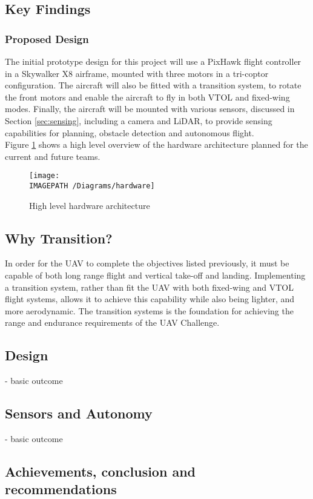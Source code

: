 \subsection{Key Findings}
\subsubsection*{Proposed Design}
The initial prototype design for this project will use a PixHawk flight controller in a Skywalker X8 airframe, mounted with three motors in a tri-coptor configuration. The aircraft will also be fitted with a transition system, to rotate the front motors and enable the aircraft to fly in both VTOL and fixed-wing modes. Finally, the aircraft will be mounted with various sensors, discussed in Section \ref{sec:sensing}, including a camera and LiDAR, to provide sensing capabilities for planning, obstacle detection and autonomous flight.\\

Figure \ref{fig:hardwarearch} shows a high level overview of the hardware architecture planned for the current and future teams.

\begin{figure}[!h]
	\centering
	\texttt{[image: \\IMAGEPATH /Diagrams/hardware]}
	\caption{High level hardware architecture}
	\label{fig:hardwarearch}
\end{figure}

\subsection{Why Transition?}
In order for the UAV to complete the objectives listed previously, it must be capable of both long range flight and vertical take-off and landing. Implementing a transition system, rather than fit the UAV with both fixed-wing and VTOL flight systems, allows it to achieve this capability while also being lighter, and more aerodynamic. The transition systems is the foundation for achieving the range and endurance requirements of the UAV Challenge.

\subsection{Design}
- basic outcome
\subsection{Sensors and Autonomy}
- basic outcome
\subsection{Achievements, conclusion and recommendations}
